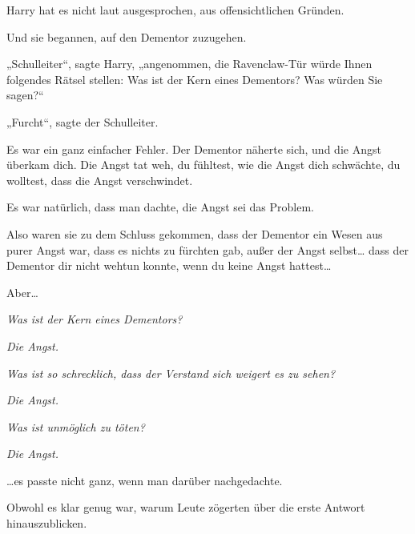Harry hat es nicht laut ausgesprochen, aus offensichtlichen Gründen.

Und sie begannen, auf den Dementor zuzugehen.

„Schulleiter“, sagte Harry, „angenommen, die Ravenclaw-Tür würde Ihnen folgendes Rätsel stellen: Was ist der Kern eines Dementors? Was würden Sie sagen?“

„Furcht“, sagte der Schulleiter.

Es war ein ganz einfacher Fehler. Der Dementor näherte sich, und die Angst überkam dich. Die Angst tat weh, du fühltest, wie die Angst dich schwächte, du wolltest, dass die Angst verschwindet.

Es war natürlich, dass man dachte, die Angst sei das Problem.

Also waren sie zu dem Schluss gekommen, dass der Dementor ein Wesen aus purer Angst war, dass es nichts zu fürchten gab, außer der Angst selbst… dass der Dementor dir nicht wehtun konnte, wenn du keine Angst hattest…

Aber…

\emph{Was ist der Kern eines Dementors?}

\emph{Die Angst.}

\emph{Was ist so schrecklich, dass der Verstand sich weigert es zu sehen?}

\emph{Die Angst.}

\emph{Was ist unmöglich zu töten?}

\emph{Die Angst.}

…es passte nicht ganz, wenn man darüber nachgedachte.

Obwohl es klar genug war, warum Leute zögerten über die erste Antwort hinauszublicken.

